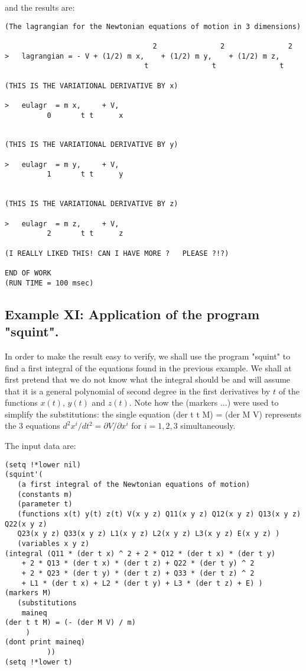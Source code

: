 \bigskip

\noindent and the results are:

\bigskip

\begin{verbatim}
(The lagrangian for the Newtonian equations of motion in 3 dimensions)

                                   2               2               2
>   lagrangian = - V + (1/2) m x,    + (1/2) m y,    + (1/2) m z,
                                 t               t               t

(THIS IS THE VARIATIONAL DERIVATIVE BY x)

>   eulagr  = m x,     + V,
          0       t t      x


(THIS IS THE VARIATIONAL DERIVATIVE BY y)

>   eulagr  = m y,     + V,
          1       t t      y


(THIS IS THE VARIATIONAL DERIVATIVE BY z)

>   eulagr  = m z,     + V,
          2       t t      z

(I REALLY LIKED THIS! CAN I HAVE MORE ?   PLEASE ?!?)

END OF WORK
(RUN TIME = 100 msec)
\end{verbatim}

\bigskip

\subsection{Example XI: Application of the program "squint".}

In order to make the result easy to verify, we shall use the program "squint"
to find a first integral of the equations found in the previous example. We
shall at first pretend that we do not know what the integral should be and will
assume that it is a general polynomial of second degree in the first
derivatives by $t$ of the functions $x(t)$, $y(t)$ and $z(t)$. Note how the
(markers ...) were used to simplify the substitutions: the single equation (der
t t M) = (der M V) represents the 3 equations $d^2x^i/dt^2 = \partial V
/\partial x^i$ for $i = 1, 2, 3$ simultaneously.

The input data are:

\bigskip

\begin{verbatim}
(setq !*lower nil)
(squint'(
   (a first integral of the Newtonian equations of motion)
   (constants m)
   (parameter t)
   (functions x(t) y(t) z(t) V(x y z) Q11(x y z) Q12(x y z) Q13(x y z) Q22(x y z)
   Q23(x y z) Q33(x y z) L1(x y z) L2(x y z) L3(x y z) E(x y z) )
   (variables x y z)
(integral (Q11 * (der t x) ^ 2 + 2 * Q12 * (der t x) * (der t y)
    + 2 * Q13 * (der t x) * (der t z) + Q22 * (der t y) ^ 2
    + 2 * Q23 * (der t y) * (der t z) + Q33 * (der t z) ^ 2
    + L1 * (der t x) + L2 * (der t y) + L3 * (der t z) + E) )
(markers M)
   (substitutions
    maineq
(der t t M) = (- (der M V) / m)
     )
(dont print maineq)
          ))
(setq !*lower t)
\end{verbatim}

